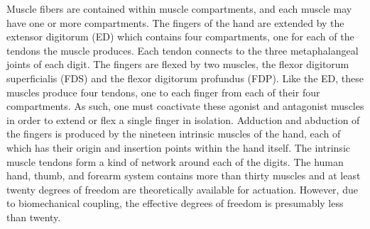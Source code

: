 \documentclass[../main.tex]{subfiles}
\begin{document}
Muscle fibers are contained within muscle compartments, and each muscle may have one or more compartments. The fingers of the hand are extended by the extensor digitorum (ED) which contains four compartments, one for each of the tendons the muscle produces. Each tendon connects to the three metaphalangeal joints of each digit. The fingers are flexed by two muscles, the flexor digitorum superficialis (FDS) and the flexor digitorum profundus (FDP). Like the ED, these muscles produce four tendons, one to each finger from each of their four compartments. As such, one must coactivate these agonist and antagonist muscles in order to extend or flex a single finger in isolation\cite{fuglevandMechanicalPropertiesNeural2011}. Adduction and abduction of the fingers is produced by the nineteen intrinsic muscles of the hand, each of which has their origin and insertion points within the hand itself\cite{vanduinenConstraintsControlHuman2011}. The intrinsic muscle tendons form a kind of network around each of the digits. The human hand, thumb, and forearm system contains more than thirty muscles and at least twenty degrees of freedom are theoretically available for actuation. However, due to biomechanical coupling, the effective degrees of freedom is presumably less than twenty.

\end{document}
